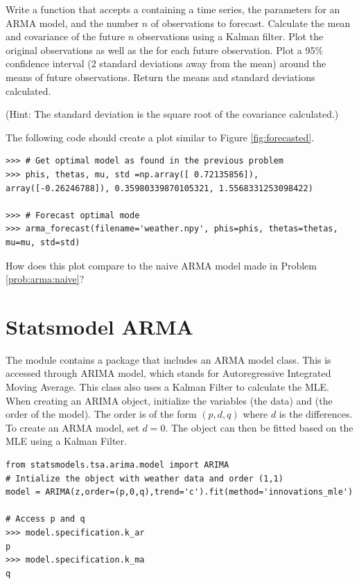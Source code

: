 \begin{problem}
\label{prob:arma:forecast}
Write a function  that accepts a  containing a time series, the parameters for an ARMA model, and the number $n$ of observations to forecast.
Calculate the mean and covariance of the future $n$ observations using a Kalman filter.
Plot the original observations as well as the  for each future observation.
Plot a 95\% confidence interval (2 standard deviations away from the mean) around the means of future observations.
Return the means and standard deviations calculated.

(Hint: The standard deviation is the square root of the covariance calculated.)

The following code should create a plot similar to Figure \ref{fig:forecasted}.

\begin{lstlisting}
>>> # Get optimal model as found in the previous problem
>>> phis, thetas, mu, std =np.array([ 0.72135856]), array([-0.26246788]), 0.35980339870105321, 1.5568331253098422)

>>> # Forecast optimal mode
>>> arma_forecast(filename='weather.npy', phis=phis, thetas=thetas, mu=mu, std=std)
\end{lstlisting}

How does this plot compare to the naive ARMA model made in Problem \ref{prob:arma:naive}?
\end{problem}

\section*{Statsmodel ARMA}

The module  contains a package that includes an ARMA model class.
This is accessed through ARIMA model, which stands for Autoregressive Integrated Moving Average.
This class also uses a Kalman Filter to calculate the MLE.
When creating an ARIMA object, initialize the variables  (the data) and  (the order of the model).
The order is of the form $(p,d,q)$ where $d$ is the differences.
To create an ARMA model, set $d=0$.
The object can then be fitted based on the MLE using a Kalman Filter.

\begin{lstlisting}
from statsmodels.tsa.arima.model import ARIMA
# Intialize the object with weather data and order (1,1)
model = ARIMA(z,order=(p,0,q),trend='c').fit(method='innovations_mle')

# Access p and q
>>> model.specification.k_ar
p
>>> model.specification.k_ma
q
\end{lstlisting}

